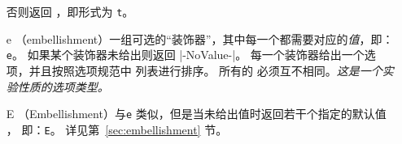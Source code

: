 \documentclass{l3doc}
\begin{document}
\begin{itemize}[font=\ttfamily]
    否则返回 ，即形式为 \texttt{t}。
    \item[e] （embellishment）一组可选的“装饰器”，其中每一个都需要对应的\emph{值}，即：\texttt{e}。
    如果某个装饰器未给出则返回 |-NoValue-|。
    每一个装饰器给出一个选项，并且按照选项规范中  列表进行排序。
    所有的  必须互不相同。\emph{这是一个实验性质的选项类型。}
    \item[E] （Embellishment）与\texttt{e} 类似，但是当未给出值时返回若干个指定的默认值 ，
    即：\texttt{E}。
    详见第~\ref{sec:embellishment} 节。
%
\end{itemize}
\end{document}
